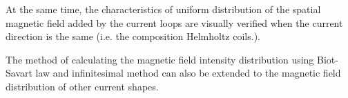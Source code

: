 \documentclass[journal,twocolumn,letterpaper]{IEEEJERM}
\begin{document}
At the same time, the characteristics of uniform distribution of the spatial magnetic field added by the current loops are visually verified when the current direction is the same (i.e. the composition Helmholtz coils.).

The method of calculating the magnetic field intensity  distribution using Biot-Savart law and infinitesimal method can also be extended to the magnetic field distribution of other current shapes.









% 






\newpage
\onecolumn 
\begin{appendices}
\section{}
\end{appendices}
\end{document}
